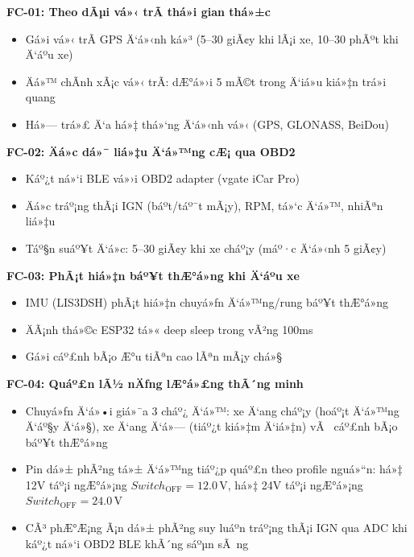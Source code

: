 \documentclass[a4paper]{extarticle}
\providecommand{\tightlist}{%
  \setlength{\itemsep}{0pt}\setlength{\parskip}{0pt}}
\begin{document}
\textbf{FC-01: Theo dÃµi vá»‹ trÃ­ thá»i gian thá»±c}

\begin{itemize}
\tightlist
\item
  Gá»­i vá»‹ trÃ­ GPS Ä‘á»‹nh ká»³ (5--30 giÃ¢y khi lÃ¡i xe, 10--30 phÃºt khi Ä‘áº­u xe)
\item
  Äá»™ chÃ­nh xÃ¡c vá»‹ trÃ­: dÆ°á»›i 5 mÃ©t trong Ä‘iá»u kiá»‡n trá»i quang
\item
  Há»— trá»£ Ä‘a há»‡ thá»‘ng Ä‘á»‹nh vá»‹ (GPS, GLONASS, BeiDou)
\end{itemize}

\textbf{FC-02: Äá»c dá»¯ liá»‡u Ä‘á»™ng cÆ¡ qua OBD2}

\begin{itemize}
\tightlist
\item
  Káº¿t ná»‘i BLE vá»›i OBD2 adapter (vgate iCar Pro)
\item
  Äá»c tráº¡ng thÃ¡i IGN (báº­t/táº¯t mÃ¡y), RPM, tá»‘c Ä‘á»™, nhiÃªn liá»‡u
\item
  Táº§n suáº¥t Ä‘á»c: 5--30 giÃ¢y khi xe cháº¡y (máº·c Ä‘á»‹nh 5 giÃ¢y)
\end{itemize}

\textbf{FC-03: PhÃ¡t hiá»‡n báº¥t thÆ°á»ng khi Ä‘áº­u xe}

\begin{itemize}
\tightlist
\item
  IMU (LIS3DSH) phÃ¡t hiá»‡n chuyá»ƒn Ä‘á»™ng/rung báº¥t thÆ°á»ng
\item
  ÄÃ¡nh thá»©c ESP32 tá»« deep sleep trong vÃ²ng 100ms
\item
  Gá»­i cáº£nh bÃ¡o Æ°u tiÃªn cao lÃªn mÃ¡y chá»§
\end{itemize}

\textbf{FC-04: Quáº£n lÃ½ nÄƒng lÆ°á»£ng thÃ´ng minh}

\begin{itemize}
\tightlist
\item
  Chuyá»ƒn Ä‘á»•i giá»¯a 3 cháº¿ Ä‘á»™: xe Ä‘ang cháº¡y (hoáº¡t Ä‘á»™ng Ä‘áº§y Ä‘á»§), xe Ä‘ang Ä‘á»—
  (tiáº¿t kiá»‡m Ä‘iá»‡n) vÃ  cáº£nh bÃ¡o báº¥t thÆ°á»ng
\item
  Pin dá»± phÃ²ng tá»± Ä‘á»™ng tiáº¿p quáº£n theo profile nguá»“n: há»‡ 12V táº¡i ngÆ°á»¡ng
  \(Switch_{\mathrm{OFF}} = 12.0\,\mathrm{V}\), há»‡ 24V táº¡i ngÆ°á»¡ng
  \(Switch_{\mathrm{OFF}} = 24.0\,\mathrm{V}\)
\item
  CÃ³ phÆ°Æ¡ng Ã¡n dá»± phÃ²ng suy luáº­n tráº¡ng thÃ¡i IGN qua ADC khi káº¿t ná»‘i OBD2
  BLE khÃ´ng sáºµn sÃ ng
\end{itemize}
\end{document}
